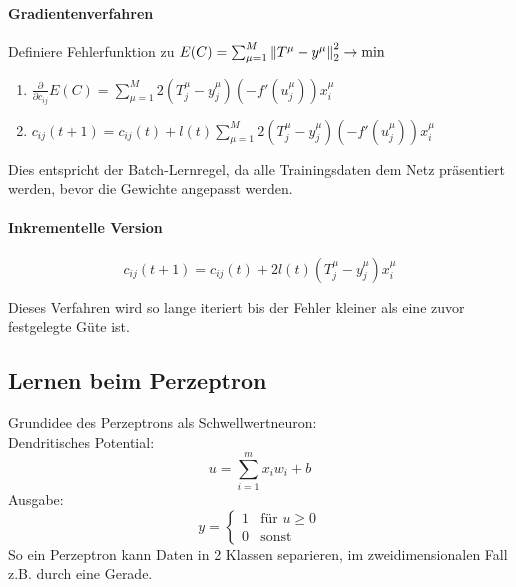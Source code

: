 \paragraph{Gradientenverfahren}
Definiere Fehlerfunktion zu $E(C) = \sum_{\mu=1}^M\left\lVert T^\mu-y^\mu\right\rVert_2^2\rightarrow \text{min}$

\begin{enumerate}
    \item $\frac{\partial}{\partial c_{ij}}E(C) = \sum_{\mu=1}^M 2(T_j^\mu-y_j^\mu)(-f'(u_j^\mu))x_i^\mu$
    \item $c_{ij}(t+1) = c_{ij}(t) + l(t)\sum_{\mu=1}^M 2(T_j^\mu-y_j^\mu)(-f'(u_j^\mu))x_i^\mu$
\end{enumerate}
Dies entspricht der Batch-Lernregel, da alle Trainingsdaten dem Netz präsentiert werden, bevor die Gewichte angepasst werden.

\paragraph{Inkrementelle Version}
\begin{equation*}
    c_{ij}(t+1) = c_{ij}(t)+2l(t)(T_j^\mu-y_j^\mu)x_i^\mu
\end{equation*}

Dieses Verfahren wird so lange iteriert bis der Fehler kleiner als eine zuvor festgelegte Güte ist.

\subsection{Lernen beim Perzeptron}
Grundidee des Perzeptrons als Schwellwertneuron:\\
Dendritisches Potential:
\begin{equation*}
    u=\sum_{i=1}^m x_i w_i + b
\end{equation*}
Ausgabe:
\begin{equation*}
    y= \begin{cases}
        1 &\text{für } u \geq 0\\
        0 &\text{sonst}
    \end{cases}
\end{equation*}
So ein Perzeptron kann Daten in 2 Klassen separieren, im zweidimensionalen Fall z.B. durch eine Gerade.
